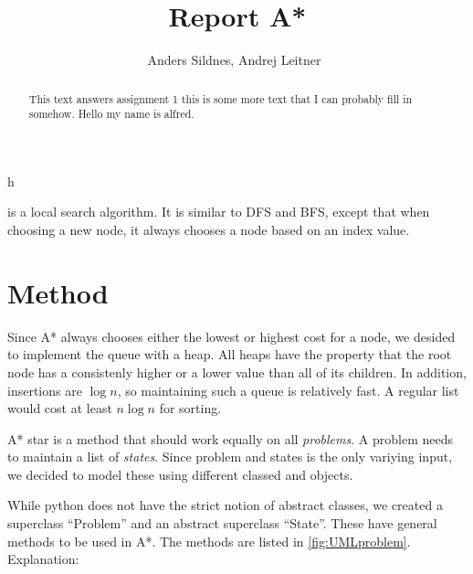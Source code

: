 \documentclass[journal]{IEEEtran}
\begin{document}
%
\title{Report A*}

\author{Anders Sildnes, Andrej Leitner~%
}%

%
{h}

\maketitle

\begin{abstract}
    This text answers assignment 1
    this is some more text that I can probably fill in somehow.
    Hello my name is alfred.
\end{abstract}

 is a local search algorithm. It is similar to DFS and BFS,
except that when choosing a new node, it always chooses a node based on an 
index value. 

\section{Method}
Since A* always chooses either the lowest or highest cost for a node, we desided
to implement the queue with a heap. All heaps have the property that the root
node has a consistenly higher or a lower value than all of its children. In addition,
insertions are $\log{n}$, so maintaining such a queue is relatively fast. A 
regular list would cost at least $n \log{n}$ for sorting.

A* star is a method that should work equally on all \textit{problems}. A problem needs
to maintain a list of \textit{states}. Since problem and states is the only 
variying input, we decided to model these using different classed and objects.

While python does not have the strict notion of abstract classes, we created
a superclass ``Problem'' and an abstract superclass ``State''. These have
general methods to be used in A*. The methods are listed in \autoref{fig:UMLproblem}.
Explanation:
\end{document}
